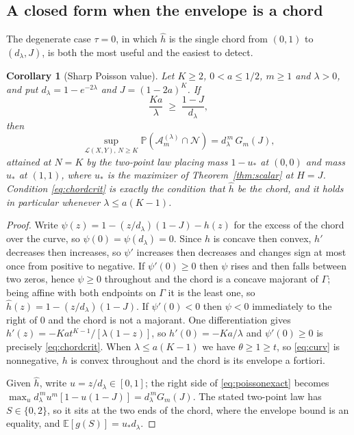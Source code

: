 \documentclass[11pt]{article}
\newtheorem{corollary}[theorem]{Corollary}
\theoremstyle{remark}\newtheorem{remark}[theorem]{Remark}
\newcommand{\E}{\mathbb E}
\newcommand{\Prob}{\mathbb P}
\newcommand{\Neg}{\mathcal N}
\begin{document}
\subsection{A closed form when the envelope is a chord}
The degenerate case $\tau=0$, in which $\hat h$ is the single chord from
$(0,1)$ to $(d_\lambda,J)$, is both the most useful and the easiest to detect.

\begin{corollary}[Sharp Poisson value]\label{cor:poissonconvex}
Let $K\ge2$, $0<a\le1/2$, $m\ge1$ and $\lambda>0$, and put
$d_\lambda=1-e^{-2\lambda}$ and $J=(1-2a)^K$. If
\begin{equation}\label{eq:chordcrit}
\frac{Ka}{\lambda}\;\ge\;\frac{1-J}{d_\lambda},
\end{equation}
then
\begin{equation}\label{eq:poissonsharp}
\sup_{\mathcal L(X,Y),\,N\ge K}\Prob(\mathcal A_m^{(\lambda)}\cap\Neg)
=d_\lambda^{\,m}\,G_m(J),
\end{equation}
attained at $N=K$ by the two-point law placing mass $1-u_*$ at $(0,0)$ and mass
$u_*$ at $(1,1)$, where $u_*$ is the maximizer of Theorem~\ref{thm:scalar} at
$H=J$. Condition \eqref{eq:chordcrit} is exactly the condition that $\hat h$ be
the chord, and it holds in particular whenever $\lambda\le a(K-1)$.
\end{corollary}
\begin{proof}
Write $\psi(z)=1-(z/d_\lambda)(1-J)-h(z)$ for the excess of the chord over the
curve, so $\psi(0)=\psi(d_\lambda)=0$. Since $h$ is concave then convex, $h'$
decreases then increases, so $\psi'$ increases then decreases and changes sign at
most once from positive to negative. If $\psi'(0)\ge0$ then $\psi$ rises and
then falls between two zeros, hence $\psi\ge0$ throughout and the chord is a
concave majorant of $\Gamma$; being affine with both endpoints on $\Gamma$ it is
the least one, so $\hat h(z)=1-(z/d_\lambda)(1-J)$. If $\psi'(0)<0$ then
$\psi<0$ immediately to the right of $0$ and the chord is not a majorant. One
differentiation gives $h'(z)=-Kat^{K-1}/[\lambda(1-z)]$, so $h'(0)=-Ka/\lambda$
and $\psi'(0)\ge0$ is precisely \eqref{eq:chordcrit}. When $\lambda\le a(K-1)$
we have $\theta\ge1\ge t$,
so \eqref{eq:curv} is nonnegative, $h$ is convex throughout and the chord is its
envelope a fortiori.

Given $\hat h$, write $u=z/d_\lambda\in[0,1]$; the right side of
\eqref{eq:poissonexact} becomes
$\max_u d_\lambda^{\,m}u^m[1-u(1-J)]=d_\lambda^{\,m}G_m(J)$. The stated two-point
law has $S\in\{0,2\}$, so it sits at the two ends of the chord, where the
envelope bound is an equality, and $\E[g(S)]=u_*d_\lambda$.
\end{proof}
\end{document}
